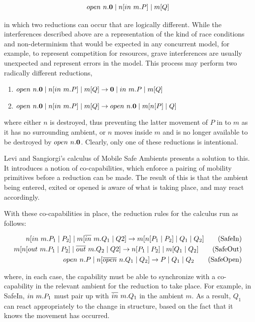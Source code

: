\begin{equation}
open\ n.\textbf{0} \;|\; n[in\ m.P] \;|\; m[Q]
\end{equation}

\noindent in which two reductions can occur that are logically
different.  While the interferences described above are a representation
of the kind of race conditions and non-determinism that would be
expected in any concurrent model, for example, to represent competition
for resources, grave interferences are usually unexpected and represent
errors in the model.  This process may perform two radically different
reductions,

\begin{enumerate}
\item $open\ n.\textbf{0} \;|\; n[in\ m.P] \;|\; m[Q] \rightarrow \textbf{0} \;|\;
in\ m.P \;|\; m[Q]$
\item $open\ n.\textbf{0} \;|\; n[in\ m.P] \;|\; m[Q] \rightarrow
open\ n.\textbf{0} \;|\; m[n[P] \;|\; Q]$
\end{enumerate}

\noindent where either $n$ is destroyed, thus preventing the latter
movement of $P$ in to $m$ as it has no surrounding ambient, or $n$ moves
inside $m$ and is no longer available to be destroyed by
$open\ n.\textbf{0}$.  Clearly, only one of these reductions is
intentional.  

Levi and Sangiorgi's calculus of Mobile Safe Ambients \cite{safeamb00,
sangiorgi:mobsafeambients} presents a solution to this.  It introduces a
notion of co-capabilities, which enforce a pairing of mobility
primitives before a reduction can be made.  The result of this is that
the ambient being entered, exited or opened is aware of what is taking
place, and may react accordingly.

With these co-capabilities in place, the reduction rules for the
calculus run as follows:

\begin{align}
 n[in\ m.P_1 \;|\; P_2] \;|\; m[\overline{in}\ m.Q_1 \;|\; Q2]
\rightarrow
m[n[P_1 \;|\; P_2] \;|\; Q_1 \;|\; Q_2] \tag{SafeIn}\\
 m[n[out\ m.P_1 \;|\; P_2] \;|\; \overline{out}\ m.Q_2 \;|\; Q2]
\rightarrow
n[P_1 \;|\; P_2] \;|\; m[Q_1 \;|\; Q_2] \tag{SafeOut}\\
 open\ n.P \;|\; n[\overline{open}\ n.Q_1 \;|\; Q_2]
\rightarrow
P \;|\; Q_1 \;|\; Q_2 \tag{SafeOpen} 
\end{align}

\noindent where, in each case, the capability must be able to
synchronize with a co-capability in the relevant ambient for the
reduction to take place.  For example, in SafeIn, $in\ m.P_1$ must
pair up with $\overline{in}\ m.Q_1$ in the ambient $m$.  As a result, $Q_1$
can react appropriately to the change in structure, based on the fact
that it knows the movement has occurred.

